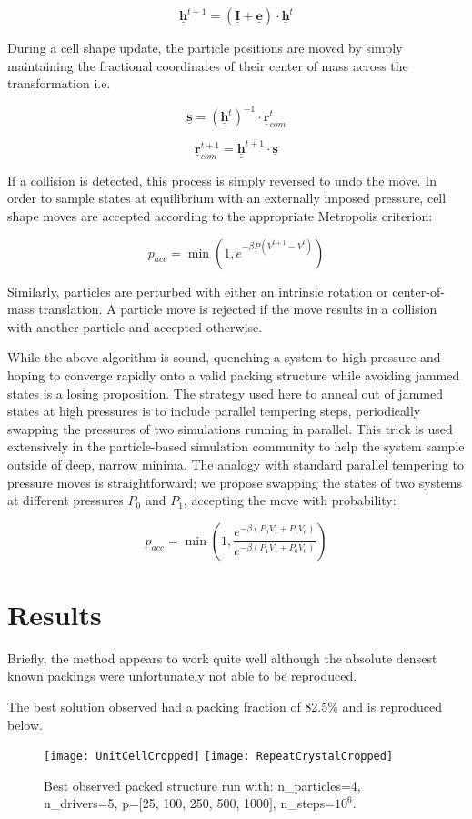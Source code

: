 \documentclass[12pt,a4paper]{article}
\begin{document}
$$ \underline{\underline{\mathbf{h}}}^{t+1} = \left( \underline{\underline{\mathbf{I}}} +  \underline{\underline{\mathbf{e}}} \right) \cdot  \underline{\underline{\mathbf{h}}}^{t}$$

During a cell shape update, the particle positions are moved by simply maintaining the fractional coordinates of their center of mass across the transformation i.e.

$$\underline{\mathbf{s}} = \left(\underline{\underline{\mathbf{h}}}^{t}\right)^{-1} \cdot \underline{\mathbf{r}}_{com}^t $$

$$\underline{\mathbf{r}}_{com}^{t+1} = \underline{\underline{\mathbf{h}}}^{t+1} \cdot \underline{\mathbf{s}} $$

If a collision is detected, this process is simply reversed to undo the move. In order to sample states at equilibrium with an externally imposed pressure, cell shape moves are accepted according to the appropriate Metropolis criterion:

$$ p_{acc} = \min\left(1, e^{-\beta P\left(V^{t+1} - V^{t}\right)} \right)$$

Similarly, particles are perturbed with either an intrinsic rotation or center-of-mass translation. A particle move is rejected if the move results in a collision with another particle and accepted otherwise.

While the above algorithm is sound, quenching a system to high pressure and hoping to converge rapidly onto a valid packing structure while avoiding jammed states is a losing proposition. The strategy used here to anneal out of jammed states at high pressures is to include parallel tempering steps, periodically swapping the pressures of two simulations running in parallel. This trick is used extensively in the particle-based simulation community to help the system sample outside of deep, narrow minima. The analogy with standard parallel tempering to pressure moves is straightforward; we propose swapping the states of two systems at different pressures $P_0$ and $P_1$, accepting the move with probability:

$$ p_{acc} = \min\left(1, \frac{e^{-\beta \left(P_0 V_1 + P_1 V_0\right)}}{e^{-\beta \left(P_1 V_1 + P_0 V_0\right)}}\right)$$

\section*{Results}

Briefly, the method appears to work quite well although the absolute densest known packings were unfortunately not able to be reproduced. 

The best solution observed had a packing fraction of 82.5\% and is reproduced below.

\begin{figure}[h!]
\begin{center}
	\texttt{[image: UnitCellCropped]}
	\texttt{[image: RepeatCrystalCropped]}
\end{center}
\caption{Best observed packed structure run with: n{\_}particles=4, n{\_}drivers=5, p=$[$25, 100, 250, 500, 1000$]$, n{\_}steps=$10^6$.}
\end{figure}
\end{document}
